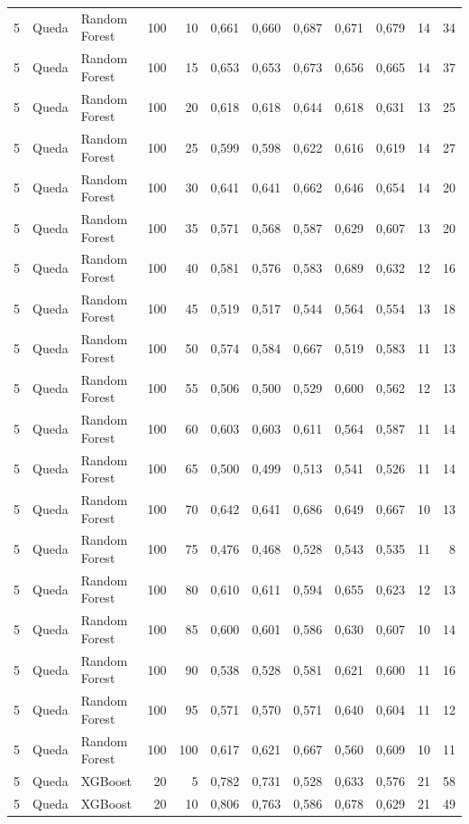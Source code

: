 \begin{longtable}{@{}rllrrrrrrrrr@{}}
5 & Queda & Random Forest & 100 & 10 & 0,661 & 0,660 & 0,687 & 0,671 & 0,679 & 14 & 34 \\
5 & Queda & Random Forest & 100 & 15 & 0,653 & 0,653 & 0,673 & 0,656 & 0,665 & 14 & 37 \\
5 & Queda & Random Forest & 100 & 20 & 0,618 & 0,618 & 0,644 & 0,618 & 0,631 & 13 & 25 \\
5 & Queda & Random Forest & 100 & 25 & 0,599 & 0,598 & 0,622 & 0,616 & 0,619 & 14 & 27 \\
5 & Queda & Random Forest & 100 & 30 & 0,641 & 0,641 & 0,662 & 0,646 & 0,654 & 14 & 20 \\
5 & Queda & Random Forest & 100 & 35 & 0,571 & 0,568 & 0,587 & 0,629 & 0,607 & 13 & 20 \\
5 & Queda & Random Forest & 100 & 40 & 0,581 & 0,576 & 0,583 & 0,689 & 0,632 & 12 & 16 \\
5 & Queda & Random Forest & 100 & 45 & 0,519 & 0,517 & 0,544 & 0,564 & 0,554 & 13 & 18 \\
5 & Queda & Random Forest & 100 & 50 & 0,574 & 0,584 & 0,667 & 0,519 & 0,583 & 11 & 13 \\
5 & Queda & Random Forest & 100 & 55 & 0,506 & 0,500 & 0,529 & 0,600 & 0,562 & 12 & 13 \\
5 & Queda & Random Forest & 100 & 60 & 0,603 & 0,603 & 0,611 & 0,564 & 0,587 & 11 & 14 \\
5 & Queda & Random Forest & 100 & 65 & 0,500 & 0,499 & 0,513 & 0,541 & 0,526 & 11 & 14 \\
5 & Queda & Random Forest & 100 & 70 & 0,642 & 0,641 & 0,686 & 0,649 & 0,667 & 10 & 13 \\
5 & Queda & Random Forest & 100 & 75 & 0,476 & 0,468 & 0,528 & 0,543 & 0,535 & 11 & 8 \\
5 & Queda & Random Forest & 100 & 80 & 0,610 & 0,611 & 0,594 & 0,655 & 0,623 & 12 & 13 \\
5 & Queda & Random Forest & 100 & 85 & 0,600 & 0,601 & 0,586 & 0,630 & 0,607 & 10 & 14 \\
5 & Queda & Random Forest & 100 & 90 & 0,538 & 0,528 & 0,581 & 0,621 & 0,600 & 11 & 16 \\
5 & Queda & Random Forest & 100 & 95 & 0,571 & 0,570 & 0,571 & 0,640 & 0,604 & 11 & 12 \\
5 & Queda & Random Forest & 100 & 100 & 0,617 & 0,621 & 0,667 & 0,560 & 0,609 & 10 & 11 \\
5 & Queda & XGBoost & 20 & 5 & 0,782 & 0,731 & 0,528 & 0,633 & 0,576 & 21 & 58 \\
5 & Queda & XGBoost & 20 & 10 & 0,806 & 0,763 & 0,586 & 0,678 & 0,629 & 21 & 49 \\

\end{longtable}
